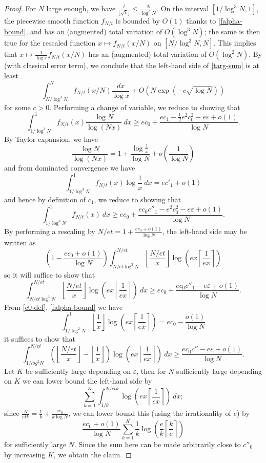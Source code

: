 \documentclass[12pt,a4paper,reqno]{amsart}
\numberwithin{equation}{section}
\theoremstyle{plain}
\theoremstyle{definition}
\newcommand\eps{\varepsilon}
\begin{document}
\begin{proof}
    For $N$ large enough, we have $\frac{t}{\lfloor\sqrt{t}\rfloor} \leq \frac{N}{\log^3 N}$.
    On the interval $[1/\log^3 N,1]$, the piecewise smooth function $f_{N/t}$ is bounded by $O(1)$ thanks to \eqref{falpha-bound}, and has an (augmented) total variation of $O(\log^3 N)$; the same is then true for the rescaled function $x \mapsto f_{N/t}(x/N)$ on $[N/\log^3 N,N]$.   This implies that $x \mapsto \frac{1}{\log x} f_{N/t}(x/N)$ has an (augmented) total variation of $O(\log^2 N)$.
   By  (with classical error term), we conclude that the left-hand side of \eqref{targ-sum} is at least
    $$ \int_{N/\log^3 N}^N f_{N/t}(x/N) \frac{dx}{\log x} + O\left( N \exp(-c\sqrt{\log N}) \right)$$
    for some $c>0$.  Performing a change of variable, we reduce to showing that
    $$  \int_{1/\log^3 N}^1 f_{N/t}(x) \frac{\log N}{\log(Nx)}\ dx 
    \geq  ec_0 + \frac{ec_1 - \frac{1}{2} e^2 c_0^2 - e \eps + o(1)}{\log N}.$$
    By Taylor expansion, we have
    $$ \frac{\log N}{\log(Nx)} = 1 + \frac{\log \frac{1}{x}}{\log N}  + o\left(\frac{1}{\log N}\right)$$
    and from dominated convergence we have
  $$
  \int_{1/\log^3 N}^1 f_{N/t}(x) \log \frac{1}{x}\ dx = ec'_1 + o(1)$$
and hence by definition of $c_1$, we reduce to showing that
$$  \int_{1/\log^3 N}^1 f_{N/t}(x)\ dx 
\geq  ec_0 + \frac{ec_0 c''_1 - e^2 c_0^2 - e\eps + o(1)}{\log N}.$$
By performing a rescaling by $N/et = 1 + \frac{ec_0+o(1)}{\log N}$, the left-hand side may be written as
$$ \left(1 - \frac{ec_0+o(1)}{\log N}\right) \int_{N/et\log^3 N}^{N/et}
\left\lfloor \frac{N/et}{x} \right\rfloor \log\left(ex \left\lceil \frac{1}{ex} \right\rceil \right) $$
so it will suffice to show that
$$
\int_{N/et\log^3 N}^{N/et}
\left\lfloor \frac{N/et}{x} \right\rfloor \log\left(ex \left\lceil \frac{1}{ex} \right\rceil \right)\ dx \geq ec_0 + \frac{ec_0 c''_1 - e\eps + o(1)}{\log N}.$$
From \eqref{c0-def}, \eqref{falpha-bound} we have
$$ \int_{1/\log^2 N}^1 \left\lfloor \frac{1}{x} \right\rfloor \log\left(ex \left\lceil \frac{1}{ex} \right\rceil \right) = ec_0 - \frac{o(1)}{\log N}$$
it suffices to show that
$$
\int_{1/log^2 N}^{N/et}
\left(\left\lfloor \frac{N/et}{x} \right\rfloor - \left\lfloor \frac{1}{x} \right\rfloor\right) \log\left(ex \left\lceil \frac{1}{ex} \right\rceil \right)\ dx \geq \frac{ec_0 c'' - e\eps + o(1)}{\log N}.$$
Let $K$ be sufficiently large depending on $\eps$, then for $N$ sufficiently large depending on $K$ we can lower bound the left-hand side by
$$ \sum_{k=1}^K \int_{1/k}^{N/etk} \log\left(ex \left\lceil \frac{1}{ex} \right\rceil \right)\ dx;$$
since $\frac{N}{etk} = \frac{1}{k} + \frac{ec_0}{k \log N}$, we can lower bound this (using the irrationality of $e$) by
$$ \frac{ec_0+o(1)}{\log N} \sum_{k=1}^K \frac{1}{k} \log\left(\frac{e}{k} \left\lceil \frac{k}{e} \right\rceil\right)$$
for sufficiently large $N$.  Since the sum here can be made arbitrarily close to $c''_0$ by increasing $K$, we obtain the claim.
\end{proof}
    
\end{document}
